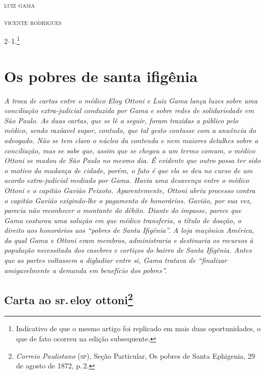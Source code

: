 \begin{flushright}
\textsc{luiz gama}

\textsc{vicente rodrigues}
\end{flushright}

2--1.\footnote{ Indicativo de que o mesmo artigo foi replicado em
  mais duas oportunidades, o que de fato ocorreu na edição subsequente.}

\part{Os pobres de santa ifigênia}

\begin{argumento}
\emph{A troca de cartas entre o médico Eloy Ottoni e Luiz Gama lança
luzes sobre uma conciliação extra-judicial conduzida por Gama e sobre
redes de solidariedade em São Paulo. As duas cartas, que se lê a seguir,
foram trazidas a público pelo médico, sendo razóavel supor, contudo, que
tal gesto contasse com a anuência do advogado. Não se tem claro o núcleo
da contenda e nem maiores detalhes sobre a conciliação, mas se sabe que,
assim que se chegou a um termo comum, o médico Ottoni se mudou de São
Paulo no mesmo dia. É evidente que outro possa ter sido o motivo da
mudança de cidade, porém, o fato é que ela se deu no curso de um acordo
extra-judicial mediado por Gama. Havia uma desavença entre o médico
Ottoni e o capitão Gavião Peixoto. Aparentemente, Ottoni abriu processo
contra o capitão Gavião exigindo-lhe o pagamento de honorários. Gavião,
por sua vez, parecia não reconhecer o montante do débito. Diante do
impasse, parece que Gama costurou uma solução em que médico transferia,
a título de doação, o direito aos honorários aos ``pobres de Santa
Ifigênia''. A loja maçônica América, da qual Gama e Ottoni eram membros,
administraria e destinaria os recursos à população necessitada dos
casebres e cortiços do bairro de Santa Ifigênia. Antes que as partes
voltassem a digladiar entre si, Gama tratava de ``finalizar amigavelmente
a demanda em benefício dos pobres''.}
\end{argumento}

\chapter{Carta ao sr.\,eloy ottoni\footnote{\emph{Correio Paulistano} (\textsc{sp}), Seção Particular, Os
  pobres de Santa Ephigenia, 29 de agosto de 1872, p.\,2.}} %

